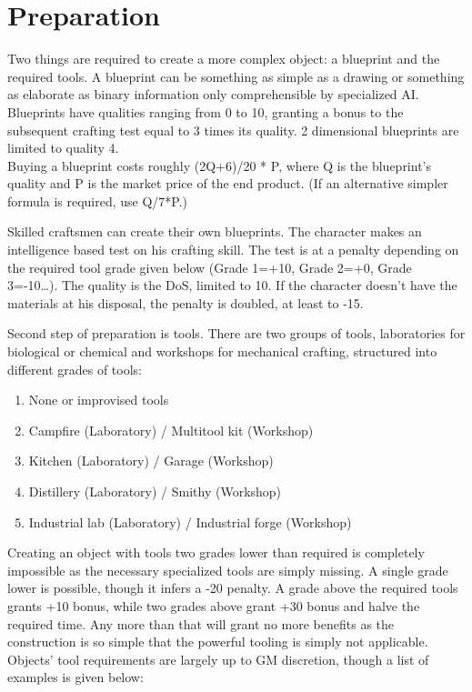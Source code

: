 \documentclass[12pt,a4paper,openany]{book}
\begin{document}
	\chapter{Preparation}
	Two things are required to create a more complex object: a blueprint and the required tools.
	A blueprint can be something as simple as a drawing or something as elaborate as binary information only comprehensible by specialized AI. Blueprints have qualities ranging from 0 to 10, granting a bonus to the subsequent crafting test equal to 3 times its quality. 2 dimensional blueprints are limited to quality 4.\\
	Buying a blueprint costs roughly (2Q+6)/20 * P, where Q is the blueprint’s quality and P is the market price of the end product. (If an alternative simpler formula is required, use Q/7*P.)\par
	Skilled craftsmen can create their own blueprints. The character makes an intelligence based test on his crafting skill. The test is at a penalty depending on the required tool grade given below (Grade 1=+10, Grade 2=+0, Grade 3=-10…). The quality is the DoS, limited to 10. If the character doesn’t have the materials at his disposal, the penalty is doubled, at least to -15.\par
	Second step of preparation is tools. There are two groups of tools, laboratories for biological or chemical and workshops for mechanical crafting, structured into different grades of tools:
	\begin{enumerate}
		\item None or improvised tools
		\item Campfire (Laboratory) / Multitool kit (Workshop)
		\item Kitchen (Laboratory) / Garage (Workshop)
		\item Distillery (Laboratory) / Smithy (Workshop)
		\item Industrial lab (Laboratory) / Industrial forge (Workshop)
	\end{enumerate}
	Creating an object with tools two grades lower than required is completely impossible as the necessary specialized tools are simply missing. A single grade lower is possible, though it infers a -20 penalty. A grade above the required tools grants +10 bonus, while two grades above grant +30 bonus and halve the required time. Any more than that will grant no more benefits as the construction is so simple that the powerful tooling is simply not applicable.\\
	Objects’ tool requirements are largely up to GM discretion, though a list of examples is given below:
\end{document}
